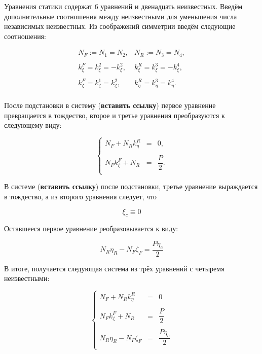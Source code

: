 Уравнения статики содержат 6 уравнений и двенадцать неизвестных. Введём дополнительные соотношения между неизвестными для уменьшения числа независимых неизвестных. Из соображений симметрии введём следующие соотношения:

\begin{equation}
\begin{array}{cc}
N_F := N_1 = N_2, & N_R := N_3 = N_4,\\
\\
k_\xi^F = k_\xi^2 = -k_\xi^2, & k_\xi^R = k_\xi^3 = -k_\xi^4,\\
\\
k_\zeta^F = k_\zeta^1 = k_\zeta^2, & k_\eta^R = k_\eta^3 = k_\eta^4.\\
\end{array}
\end{equation}

После подстановки в систему (\textbf{вставить ссылку}) первое уравнение превращается в тождество, второе и третье уравнения преобразуются к следующему виду:

\begin{equation}
\left\{
\begin{array}{rcl}
 N_F+N_Rk_\eta^R & = & 0,\\
 \\
 N_Fk_\zeta^F+N_R & = & \dfrac{P}{2}.\\
\end{array}
\right.
\end{equation}

В системе (\textbf{вставить ссылку}) после подстановки, третье уравнение выраждается в тождество, а из второго уравнения следует, что

$$
\xi_c \equiv 0
$$

Оставшееся первое уравнение реобразовывается к виду:

$$
N_R\eta_R-N_F\zeta_F = \dfrac{P\eta_c}{2}
$$

В итоге, получается следующая система из трёх уравнений с четыремя неизвестными:

\begin{equation}
\left\{
\begin{array}{rcl}
 N_F+N_Rk_\eta^R & = & 0\\
 \\
 N_Fk_\zeta^F+N_R & = & \dfrac{P}{2}\\
 \\
 N_R\eta_R-N_F\zeta_F & = & \dfrac{P\eta_c}{2} \\
\end{array}
\right.
\end{equation}

